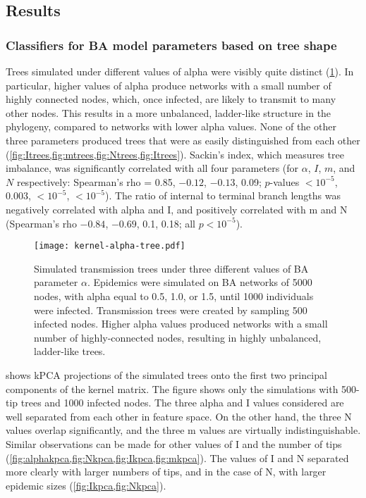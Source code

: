 \subsection{Results}

\subsubsection*{Classifiers for BA model parameters based on tree shape}



Trees simulated under different values of \gls{alpha} were visibly quite
distinct (\cref{fig:alphatrees}). In particular, higher values of \gls{alpha}
produce networks with a small number of highly connected nodes, which, once
infected, are likely to transmit to many other nodes. This results in a more
unbalanced, ladder-like structure in the phylogeny, compared to networks with
lower \gls{alpha} values. None of the other three parameters produced trees
that were as easily distinguished from each other
(\cref{fig:Itrees,fig:mtrees,fig:Ntrees,fig:Itrees}).  Sackin's index, which
measures tree imbalance, was significantly correlated with all four parameters
    (for $\alpha$, $I$, $m$, and $N$ respectively: Spearman's rho =
     0.85,
     \ensuremath{-0.12},
     \ensuremath{-0.13},
     0.09;
     $p$-values
     ${<}10^{-5}$,
     $0.003$,
     ${<}10^{-5}$,
     ${<}10^{-5}$).
The ratio of internal to terminal branch lengths was negatively correlated with
\gls{alpha} and \gls{I}, and positively correlated with \gls{m} and \gls{N}
  (Spearman's rho
    \ensuremath{-0.84},
    \ensuremath{-0.69},
    0.1,
    0.18;
  all $p < 10^{-5}$).

\begin{figure}[ht]
  \centering
  \texttt{[image: kernel-alpha-tree.pdf]}
  \caption[Simulated transmission trees under three different values of BA parameter $\alpha$]{
    Simulated transmission trees under three different values of BA parameter
    $\alpha$. Epidemics were simulated on \gls{BA} networks of 5000 nodes, with
    \gls{alpha} equal to 0.5, 1.0, or 1.5, until 1000 individuals were
    infected. Transmission trees were created by sampling 500 infected nodes.
    Higher \gls{alpha} values produced networks with a small number of
    highly-connected nodes, resulting in highly unbalanced, ladder-like trees.
  }
  \label{fig:alphatrees}
\end{figure}

 shows \gls{kPCA} projections of the simulated trees onto the
first two principal components of the kernel matrix. The figure shows only the
simulations with 500-tip trees and 1000 infected nodes. The three \gls{alpha}
and \gls{I} values considered are well separated from each other in feature
space. On the other hand, the three \gls{N} values overlap significantly, and
the three \gls{m} values are virtually indistinguishable. Similar observations
can be made for other values of \gls{I} and the number of tips
(\cref{fig:alphakpca,fig:Nkpca,fig:Ikpca,fig:mkpca}). The values of \gls{I} and
\gls{N} separated more clearly with larger numbers of tips, and in the case of
\gls{N}, with larger epidemic sizes {\color{blue}(\cref{fig:Ikpca,fig:Nkpca})}.

